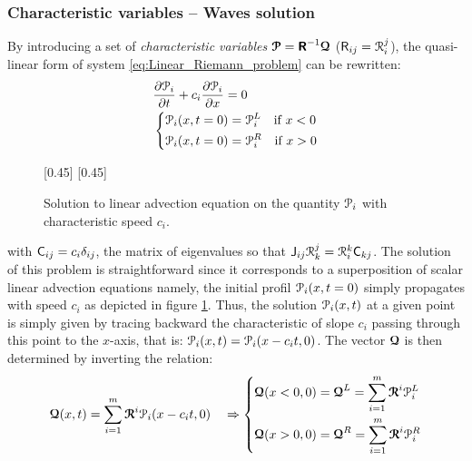 \subsubsection*{Characteristic variables -- Waves solution}
By introducing a set of \textit{characteristic variables} ${\boldsymbol{\mathcal{P}}}=\boldsymbol{\mathsf{R}}^{-1}{\boldsymbol{\mathcal{Q}}}$ ($\mathsf{R}_{ij}=\mathcal{R}^j_i$), the quasi-linear form of system \eqref{eq:Linear_Riemann_problem} can be rewritten:
\begin{equation*}
  \begin{aligned}
    &\frac{\partial \mathcal{P}_i}{\partial t} + c_i\frac{\partial \mathcal{P}_i}{\partial x} = 0 \\
    &\left\lbrace 
      \begin{aligned}
        & \mathcal{P}_i(x,t=0) = \mathcal{P}_i^L \quad \text{if } x< 0\\
        & \mathcal{P}_i(x,t=0) = \mathcal{P}_i^R \quad \text{if } x> 0
      \end{aligned}
    \right.
  \end{aligned}
\end{equation*}
\begin{figure}[h]
  \centering
  \subcaptionbox*{}[0.45\linewidth]{}
  \subcaptionbox*{}[0.45\linewidth]{}
  \caption{Solution to linear advection equation on the quantity $\mathcal{P}_i$ with characteristic speed $c_i$.}
  \label{fig:advection}
\end{figure}
with $\mathsf{C}_{ij}=c_i\delta_{ij}$, the matrix of eigenvalues so that $\mathsf{J}_{ij} \mathcal{R}^j_k = \mathcal{R}^k_i\mathsf{C}_{kj}$. The solution of this problem is straightforward since it corresponds to a superposition of scalar linear advection equations namely, the initial profil $\mathcal{P}_i(x,t=0)$ simply propagates with speed $c_i$ as depicted in figure \ref{fig:advection}. Thus, the solution  $\mathcal{P}_i(x,t)$ at a given point is simply given by tracing backward the characteristic of slope $c_i$ passing through this point to the $x$-axis, that is: $\mathcal{P}_i(x,t)=\mathcal{P}_i(x-c_it,0)$. 
The vector ${\boldsymbol{\mathcal{Q}}}$ is then determined by inverting the relation:
\begin{equation}
  \label{eq:Q_expansion}
  {\boldsymbol{\mathcal{Q}}}(x,t) = \sum_{i=1}^m {\boldsymbol{\mathcal{R}}}^i \mathcal{P}_i(x-c_it,0) \quad \Rightarrow
  \left\lbrace
    \begin{aligned}
      & {\boldsymbol{\mathcal{Q}}}(x<0,0)={\boldsymbol{\mathcal{Q}}}^L=\sum_{i=1}^{m}{\boldsymbol{\mathcal{R}}}^i \mathcal{P}_i^L\\
      & {\boldsymbol{\mathcal{Q}}}(x>0,0)={\boldsymbol{\mathcal{Q}}}^R= \sum_{i=1}^{m}{\boldsymbol{\mathcal{R}}}^i \mathcal{P}_i^R
    \end{aligned}
    \right.
\end{equation}
